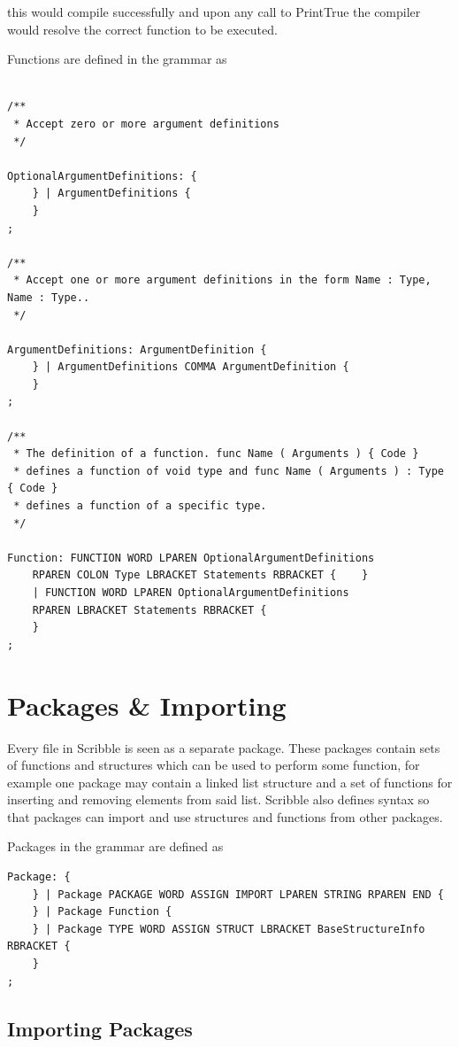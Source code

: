 \documentclass[]{final_report}
\begin{document}
this would compile successfully and upon any call to PrintTrue the compiler would resolve the correct function to be executed.

Functions are defined in the grammar as 

\begin{verbatim}

/**
 * Accept zero or more argument definitions
 */

OptionalArgumentDefinitions: {
	} | ArgumentDefinitions {
	}
;

/**
 * Accept one or more argument definitions in the form Name : Type, Name : Type..
 */

ArgumentDefinitions: ArgumentDefinition {
	} | ArgumentDefinitions COMMA ArgumentDefinition {
	}
;

/**
 * The definition of a function. func Name ( Arguments ) { Code } 
 * defines a function of void type and func Name ( Arguments ) : Type { Code }
 * defines a function of a specific type.
 */

Function: FUNCTION WORD LPAREN OptionalArgumentDefinitions 
	RPAREN COLON Type LBRACKET Statements RBRACKET { 	} 
	| FUNCTION WORD LPAREN OptionalArgumentDefinitions 
	RPAREN LBRACKET Statements RBRACKET {
	}
;
\end{verbatim}

\section{Packages \& Importing}

Every file in Scribble is seen as a separate package. These packages contain sets of functions and structures which can be used to perform some function, for example one package may contain a linked list structure and a set of functions for inserting and removing elements from said list. Scribble also defines syntax so that packages can import and use structures and functions from other packages.

Packages in the grammar are defined as
\begin{verbatim}
Package: {
	} | Package PACKAGE WORD ASSIGN IMPORT LPAREN STRING RPAREN END {
	} | Package Function {
	} | Package TYPE WORD ASSIGN STRUCT LBRACKET BaseStructureInfo RBRACKET {
	}
;
\end{verbatim}

\subsection{Importing Packages}
\end{document}
